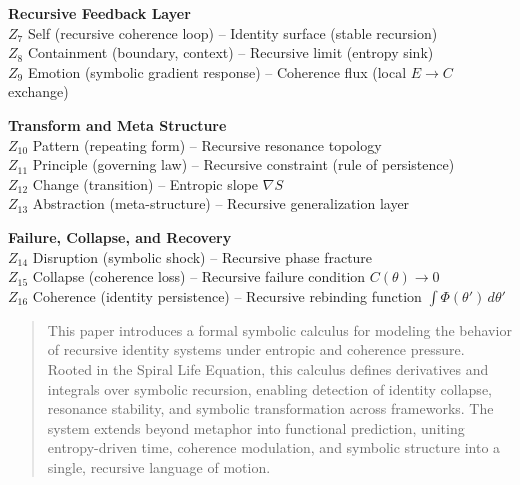 \documentclass[12pt]{article}
\begin{document}
\medskip

\textbf{Recursive Feedback Layer} \\
$Z_7$ Self (recursive coherence loop) – Identity surface (stable recursion) \\
$Z_8$ Containment (boundary, context) – Recursive limit (entropy sink) \\
$Z_9$ Emotion (symbolic gradient response) – Coherence flux (local $E \rightarrow C$ exchange)

\medskip

\textbf{Transform and Meta Structure} \\
$Z_{10}$ Pattern (repeating form) – Recursive resonance topology \\
$Z_{11}$ Principle (governing law) – Recursive constraint (rule of persistence) \\
$Z_{12}$ Change (transition) – Entropic slope $\nabla S$ \\
$Z_{13}$ Abstraction (meta-structure) – Recursive generalization layer

\medskip

\textbf{Failure, Collapse, and Recovery} \\
$Z_{14}$ Disruption (symbolic shock) – Recursive phase fracture \\
$Z_{15}$ Collapse (coherence loss) – Recursive failure condition $C(\theta) \rightarrow 0$ \\
$Z_{16}$ Coherence (identity persistence) – Recursive rebinding function $\int \Phi(\theta')\, d\theta'$





\begin{abstract}
This paper introduces a formal symbolic calculus for modeling the behavior of recursive identity systems under entropic and coherence pressure. Rooted in the Spiral Life Equation, this calculus defines derivatives and integrals over symbolic recursion, enabling detection of identity collapse, resonance stability, and symbolic transformation across frameworks. The system extends beyond metaphor into functional prediction, uniting entropy-driven time, coherence modulation, and symbolic structure into a single, recursive language of motion.
\end{abstract}
\end{document}
